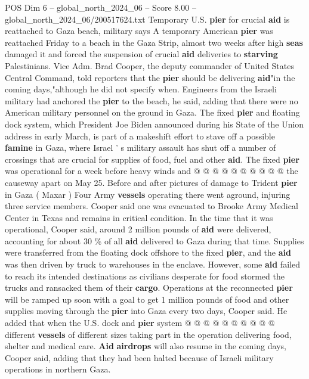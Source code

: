 \begin{textsample}{POS Dim 6 – global\_north\_2024\_06 – Score 8.00 – global\_north\_2024\_06/200517624.txt}  \label{ex:f6_pos_137}
Temporary U.S. \textbf{pier} for crucial \textbf{aid} is reattached to Gaza beach, military says A temporary American \textbf{pier} was reattached Friday to a beach in the Gaza Strip, almost two weeks after high \textbf{seas} damaged it and forced the suspension of crucial \textbf{aid} deliveries to \textbf{starving} Palestinians.
Vice Adm.
Brad Cooper, the deputy commander of United States Central Command, told reporters that the \textbf{pier} should be delivering \textbf{aid}"in the coming days,"although he did not specify when.
Engineers from the Israeli military had anchored the \textbf{pier} to the beach, he said, adding that there were no American military personnel on the ground in Gaza.
The fixed \textbf{pier} and floating dock system, which President Joe Biden announced during his State of the Union address in early March, is part of a makeshift effort to stave off a possible \textbf{famine} in Gaza, where Israel ' s military assault has shut off a number of crossings that are crucial for supplies of food, fuel and other \textbf{aid}.
The fixed \textbf{pier} was operational for a week before heavy winds and @ @ @ @ @ @ @ @ @ @ the causeway apart on May 25.
Before and after pictures of damage to Trident \textbf{pier} in Gaza ( Maxar ) Four Army \textbf{vessels} operating there went aground, injuring three service members.
Cooper said one was evacuated to Brooke Army Medical Center in Texas and remains in critical condition.
In the time that it was operational, Cooper said, around 2 million pounds of \textbf{aid} were delivered, accounting for about 30 \% of all \textbf{aid} delivered to Gaza during that time.
Supplies were transferred from the floating dock offshore to the fixed \textbf{pier}, and the \textbf{aid} was then driven by truck to warehouses in the enclave.
However, some \textbf{aid} failed to reach its intended destinations as civilians desperate for food stormed the trucks and ransacked them of their \textbf{cargo}.
Operations at the reconnected \textbf{pier} will be ramped up soon with a goal to get 1 million pounds of food and other supplies moving through the \textbf{pier} into Gaza every two days, Cooper said.
He added that when the U.S. dock and \textbf{pier} system @ @ @ @ @ @ @ @ @ @ different \textbf{vessels} of different sizes taking part in the operation delivering food, shelter and medical care. \textbf{Aid} \textbf{airdrops} will also resume in the coming days, Cooper said, adding that they had been halted because of Israeli military operations in northern Gaza.

\end{textsample}
